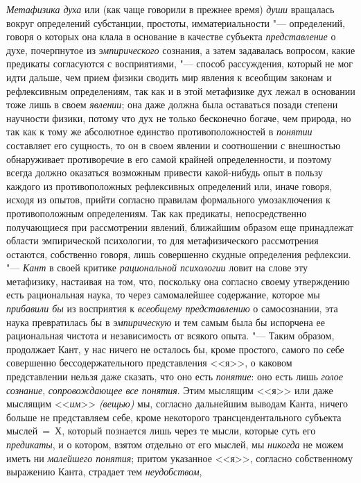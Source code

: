 {\em Метафизика духа} или
(как чаще говорили в прежнее время)
{\em души} вращалась
вокруг определений субстанции, простоты, имматериальности
"--- определений, говоря о которых она клала в основание в
качестве субъекта {\em представление}
о духе, почерпнутое из
{\em эмпирического}
сознания, а затем задавалась вопросом, какие предикаты
согласуются с восприятиями, "--- способ рассуждения, который не
мог идти дальше, чем прием физики сводить мир явления к всеобщим законам и
рефлексивным определениям, так как и в этой метафизике дух лежал в
основании тоже лишь в своем
{\em явлении}; она даже
должна была оставаться позади степени научности физики,
потому что дух не только бесконечно богаче, чем природа, но
так как к тому же абсолютное единство противоположностей в
{\em понятии} составляет
его сущность, то он в своем явлении и соотношении с внешностью обнаруживает
противоречие в его самой крайней определенности, и поэтому всегда должно
оказаться возможным привести какой-нибудь опыт в пользу каждого из
противоположных рефлексивных определений или, иначе говоря, исходя из
опытов, прийти согласно правилам формального умозаключения к
противоположным определениям. Так как предикаты, непосредственно
получающиеся при рассмотрении явлений, ближайшим образом еще принадлежат
области эмпирической психологии, то для метафизического рассмотрения
остаются, собственно говоря, лишь совершенно скудные определения
рефлексии. "--- {\em Кант} в
своей критике {\em рациональной
психологии} ловит на слове эту метафизику, настаивая на том,
что, поскольку она согласно своему утверждению есть рациональная наука, то
через самомалейшее содержание, которое мы
{\em прибавили бы} из
восприятия к {\em всеобщему
представлению} о самосознании, эта наука превратилась бы в
{\em эмпирическую} и тем
самым была бы испорчена ее рациональная чистота и независимость от всякого
опыта. "--- Таким образом, продолжает Кант, у нас ничего не
осталось бы, кроме простого, самого по себе совершенно бессодержательного
представления <<я>>, о каковом представлении нельзя даже сказать, что оно
есть {\em понятие}: оно
есть лишь {\em голое сознание},
{\em сопровождающее все понятия}.
Этим мыслящим <<я>> или даже мыслящим
<<{\em им}>>
{\em (вещью)} мы, согласно
дальнейшим выводам Канта, ничего больше не представляем себе, кроме
некоторого трансцендентального субъекта мыслей~=~Х, который познается лишь
через те мысли, которые суть его
{\em предикаты}, и о
котором, взятом отдельно от его мыслей, мы
{\em никогда} не можем
иметь ни {\em малейшего понятия};
притом указанное <<я>>, согласно собственному выражению Канта,
страдает тем {\em неудобством},
